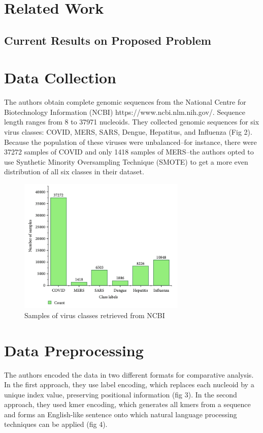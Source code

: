 \documentclass[journal]{IEEEtran}
\begin{document}
\section{Related Work}
\lipsum[1] %

\subsection{Current Results on Proposed Problem}
\lipsum[1] %

\section{Data Collection}
The authors obtain complete genomic sequences from the 
National Centre for Biotechnology Information (NCBI) https://www.ncbi.nlm.nih.gov/.
Sequence length ranges from 8 to 37971 nucleoids. They collected genomic sequences
for six virus classes: COVID, MERS, SARS, Dengue, Hepatitus, and Influenza (Fig 2).
Because the population of these viruses were unbalanced--for instance, there were 37272
samples of COVID and only 1418 samples of MERS--the authors opted to use
Synthetic Minority Oversampling Technique (SMOTE) to get a more even distribution of
all six classes in their dataset.

\begin{figure}[h]
  \centering
  \includegraphics[width=8cm]{figures/data_collection.png}
  \caption{Samples of virus classes retrieved from NCBI}
\end{figure}

\section{Data Preprocessing}
The authors encoded the data in two different formats for comparative analysis.
In the first approach, they use label encoding, which replaces each nucleoid by a unique index value,
preserving positional information (fig 3).
In the second approach, they used kmer encoding, which generates all kmers from a sequence 
and forms an English-like sentence onto which natural language processing techniques
can be applied (fig 4).
\end{document}
